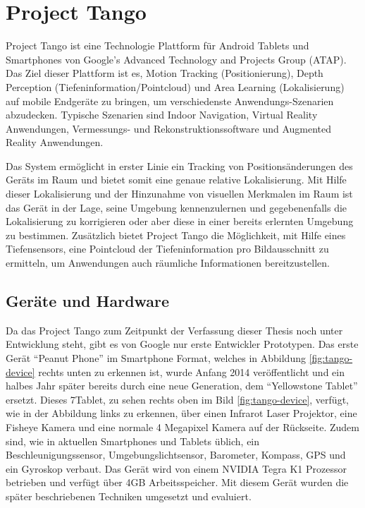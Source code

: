 
\section{Project Tango} \label{sec:theory_project_tango}

Project Tango ist eine Technologie Plattform für Android Tablets und Smartphones von Google’s Advanced Technology and Projects Group (ATAP). Das Ziel dieser Plattform ist es, Motion Tracking (Positionierung), Depth Perception (Tiefeninformation/Pointcloud) und Area Learning (Lokalisierung) auf mobile Endgeräte zu bringen, um verschiedenste Anwendungs-Szenarien abzudecken. Typische Szenarien sind Indoor Navigation, Virtual Reality Anwendungen, Vermessungs- und Rekonstruktions\-software und Augmented Reality Anwendungen.

Das System ermöglicht in erster Linie ein Tracking von Positionsänderungen des Geräts im Raum und bietet somit eine genaue relative Lokalisierung. Mit Hilfe dieser Lokalisierung und der Hinzunahme von visuellen Merkmalen im Raum ist das Gerät in der Lage, seine Umgebung kennenzulernen und gegebenenfalls die Lokalisierung zu korrigieren oder aber diese in einer bereits erlernten Umgebung zu bestimmen. Zusätzlich bietet Project Tango die Möglichkeit, mit Hilfe eines Tiefensensors, eine Pointcloud der Tiefeninformation pro Bildausschnitt zu ermitteln, um Anwendungen auch räumliche Informationen bereitzustellen.  \citep{Proje19:online} 

\subsection{Geräte und Hardware}

Da das Project Tango zum Zeitpunkt der Verfassung dieser Thesis noch unter Entwicklung steht, gibt es von Google nur erste Entwickler Prototypen. Das erste Gerät \enquote{Peanut Phone} im Smartphone Format, welches in Abbildung \ref{fig:tango-device} rechts unten zu erkennen ist, wurde Anfang 2014 veröffentlicht und ein halbes Jahr später bereits durch eine neue Generation, dem \enquote{Yellowstone Tablet} ersetzt. Dieses 7\dq Tablet, zu sehen rechts oben im Bild \ref{fig:tango-device}, verfügt, wie in der Abbildung links zu erkennen, über einen Infrarot Laser Projektor, eine Fisheye Kamera und eine normale 4 Megapixel Kamera auf der Rückseite. Zudem sind, wie in aktuellen Smartphones und Tablets üblich, ein Beschleunigungssensor, Umgebungslichtsensor, Barometer, Kompass, GPS und ein Gyroskop verbaut. Das Gerät wird von einem NVIDIA Tegra K1 Prozessor betrieben und verfügt über 4GB Arbeitsspeicher. \citep{Proje19:online} Mit diesem Gerät wurden die später beschriebenen Techniken umgesetzt und evaluiert. 

